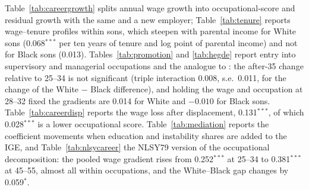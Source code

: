 Table~\ref{tab:careergrowth} splits annual wage growth into occupational-score and residual growth with the same and a
new employer; Table~\ref{tab:tenure} reports wage--tenure profiles within sons, which steepen with parental income for
White sons (0.068$^{***}$ per ten years of tenure and log point of parental income) and not for Black sons (0.013).
Tables~\ref{tab:promotion} and \ref{tab:hegde} report entry into supervisory and managerial occupations and the
analogue to \citet{hegde2026racial}: the after-35 change relative to 25--34 is not significant (triple interaction
0.008, s.e.\ 0.011, for the change of the White $-$ Black difference), and holding the wage and occupation at 28--32 fixed the gradients are 0.014 for White and
$-0.010$ for Black sons. Table~\ref{tab:careerdisp} reports the wage loss after displacement, 0.131$^{***}$, of which
0.028$^{***}$ is a lower occupational score. Table~\ref{tab:mediation} reports the coefficient movements when education
and instability shares are added to the IGE, and Table~\ref{tab:nlsycareer} the NLSY79 version of the occupational
decomposition: the pooled wage gradient rises from 0.252$^{***}$ at 25--34 to 0.381$^{***}$ at 45--55, almost all within
occupations, and the White--Black gap changes by 0.059$^{*}$.








